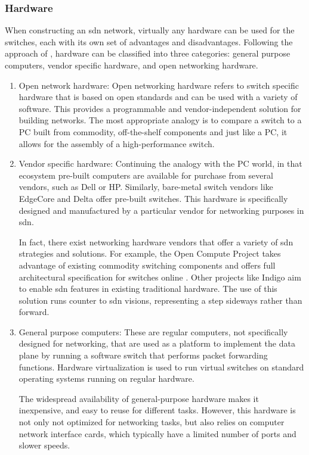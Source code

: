 \subsubsection{Hardware}
When constructing an \gls{sdn} network, virtually any hardware can be used for the switches, each with its own set of advantages and disadvantages. Following the approach of \cite{xia_survey_2015}, hardware can be classified into three categories: general purpose computers, vendor specific hardware, and open networking hardware. 

\begin{enumerate}
	\item Open network hardware: 
    Open networking hardware refers to switch specific hardware that is based on open standards and can be used with a variety of software. This provides a programmable and vendor-independent solution for building networks. The most appropriate analogy is to compare a switch to a PC built from commodity, off-the-shelf components and just like a PC, it allows for the assembly of a high-performance switch\cite{peterson_software-defined_2021}. 

\item Vendor specific hardware:
    Continuing the analogy with the PC world, in that ecosystem pre-built computers are available for purchase from several vendors, such as Dell or HP. Similarly, bare-metal switch vendors like EdgeCore and Delta offer pre-built switches\cite{peterson_software-defined_2021}. This hardware is specifically designed and manufactured by a particular vendor for networking purposes in \gls{sdn}. 

    In fact, there exist networking hardware vendors that offer a variety of \gls{sdn} strategies and solutions. For example, the Open Compute Project takes advantage of existing commodity switching components and offers full architectural specification for switches online \cite{noauthor_open_nodate-1}. Other projects like Indigo\cite{noauthor_indigo_nodate} aim to enable \gls{sdn} features in existing traditional hardware. The use of this solution runs counter to \gls{sdn} visions, representing a step sideways rather than forward.

	\item     General purpose computers:
    These are regular computers, not specifically designed for networking, that are used as a platform to implement the data plane by running a software switch that performs packet forwarding functions. Hardware virtualization is used to run virtual switches on standard operating systems running on regular hardware.

    The widespread availability of general-purpose hardware makes it inexpensive, and easy to reuse for different tasks. However, this hardware is not only not optimized for networking tasks, but also relies on computer network interface cards, which typically have a limited number of ports and slower speeds.
\end{enumerate}

